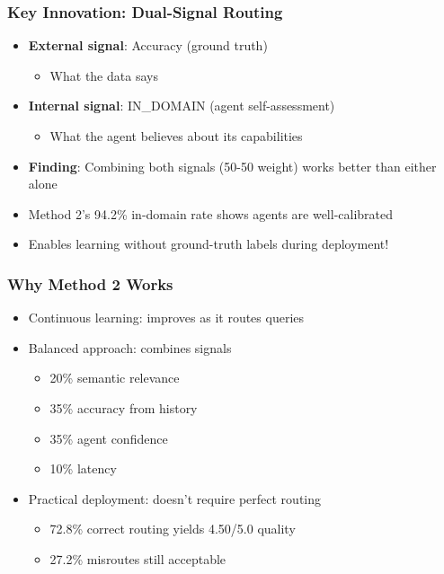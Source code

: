 \documentclass{beamer}
\begin{document}
\begin{frame}
\frametitle{Key Innovation: Dual-Signal Routing}
\begin{itemize}
    \item \textbf{External signal}: Accuracy (ground truth)
    \begin{itemize}
        \item What the data says
    \end{itemize}
    \pause
    \item \textbf{Internal signal}: IN\_DOMAIN (agent self-assessment)
    \begin{itemize}
        \item What the agent believes about its capabilities
    \end{itemize}
    \pause
    \item \textbf{Finding}: Combining both signals (50-50 weight) works better than either alone
    \pause
    \item Method 2's 94.2\% in-domain rate shows agents are well-calibrated
    \item Enables learning without ground-truth labels during deployment!
\end{itemize}
\end{frame}

\begin{frame}
\frametitle{Why Method 2 Works}
\begin{itemize}
    \item Continuous learning: improves as it routes queries
    \pause
    \item Balanced approach: combines signals
    \begin{itemize}
        \item 20\% semantic relevance
        \item 35\% accuracy from history
        \item 35\% agent confidence
        \item 10\% latency
    \end{itemize}
    \pause
    \item Practical deployment: doesn't require perfect routing
    \begin{itemize}
        \item 72.8\% correct routing yields 4.50/5.0 quality
        \item 27.2\% misroutes still acceptable
    \end{itemize}
\end{itemize}
\end{frame}
\end{document}
